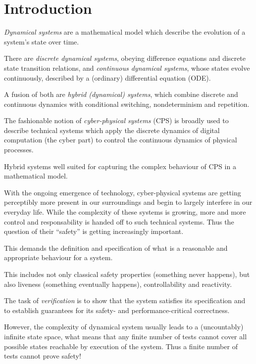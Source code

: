 \chapter{Introduction}

    \emph{Dynamical systems} are a mathematical model which describe the evolution of a system's
    state over time.
    
    There are \emph{discrete dynamical systems}, obeying difference equations and discrete state transition relations,
    and \emph{continuous dynamical systems}, whose states evolve continuously, described by a (ordinary) differential equation (ODE).

    A fusion of both are \emph{hybrid (dynamical) systems}, which combine discrete and continuous dynamics with conditional switching, nondeterminism and repetition.

    
    The fashionable notion of \emph{cyber-physical systems} (CPS) is broadly used to describe technical systems which apply the discrete dynamics of digital computation (the cyber part) to control the continuous dynamics of physical processes.

    Hybrid systems well suited for capturing the complex behaviour of CPS in a mathematical model.

    With the ongoing emergence of technology, cyber-physical systems are getting perceptibly more present in our surroundings and begin to largely interfere in our everyday life.
    While the complexity of these systems is growing, more and more control and responsability is handed off to such technical systems.
    Thus the question of their ``safety'' is getting increasingly important.
    
    This demands the definition and specification of what is a reasonable and appropriate behaviour for a system.

    This includes not only classical safety properties (something never happens), but also liveness (something eventually happens), controllability and reactivity.

    The task of \emph{verification} is to show that the system satisfies its specification and to establish guarantees for its safety- and performance-critical correctness.

    However, the complexity of dynamical system usually leads to a (uncountably) infinite state space, what means that any finite number of tests cannot cover all possible states reachable by execution of the system. Thus a finite number of tests cannot prove safety!
    
